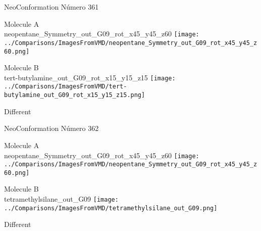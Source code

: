  \newpage

\vtab[-3cm]
\begin{center}
{\large NeoConformation \tab Número 361}
\end{center}
\begin{multicols}{2}
\begin{center}
Molecule A \\ 
neopentane\_Symmetry\_out\_G09\_rot\_x45\_y45\_z60
\texttt{[image: ../Comparisons/ImagesFromVMD/neopentane\_Symmetry\_out\_G09\_rot\_x45\_y45\_z60.png]}
\\
\vtab

\columnbreak
Molecule B \\ 
tert-butylamine\_out\_G09\_rot\_x15\_y15\_z15
\texttt{[image: ../Comparisons/ImagesFromVMD/tert-butylamine\_out\_G09\_rot\_x15\_y15\_z15.png]}
\\
\vtab


\end{center}
\end{multicols}
\begin{center}
\textcolor{NavyBlue}{\Large Different}
\end{center}

 \newpage

\vtab[-3cm]
\begin{center}
{\large NeoConformation \tab Número 362}
\end{center}
\begin{multicols}{2}
\begin{center}
Molecule A \\ 
neopentane\_Symmetry\_out\_G09\_rot\_x45\_y45\_z60
\texttt{[image: ../Comparisons/ImagesFromVMD/neopentane\_Symmetry\_out\_G09\_rot\_x45\_y45\_z60.png]}
\\
\vtab

\columnbreak
Molecule B \\ 
tetramethylsilane\_out\_G09
\texttt{[image: ../Comparisons/ImagesFromVMD/tetramethylsilane\_out\_G09.png]}
\\
\vtab


\end{center}
\end{multicols}
\begin{center}
\textcolor{NavyBlue}{\Large Different}
\end{center}

 \newpage

